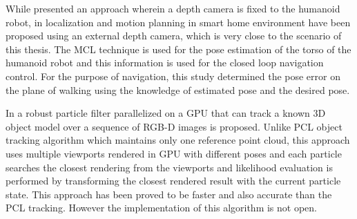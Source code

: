 While \cite{maier2012real} presented an approach wherein a depth camera is fixed to the humanoid robot, in \cite{cervera2012localization} localization and motion planning in smart home environment have been proposed using an external depth camera, which is very close to the scenario of this thesis. The MCL technique is used for the pose estimation of the torso of the humanoid robot and this information is used for the closed loop navigation control. For the purpose of navigation, this study determined the pose error on the plane of walking using the knowledge of estimated pose and the desired pose. 
	
In \cite{choi2013rgb} a robust particle filter parallelized on a GPU that can track a known 3D object model over a sequence of RGB-D images is proposed. Unlike PCL object tracking algorithm \cite{rusu20113d} which maintains only one reference point cloud, this approach uses multiple viewports rendered in GPU with different poses and each particle searches the closest rendering from the viewports and likelihood evaluation is performed by transforming the closest rendered result with the current particle state. This approach has been proved to be faster and also accurate than the PCL tracking. However the implementation of this algorithm is not open.
